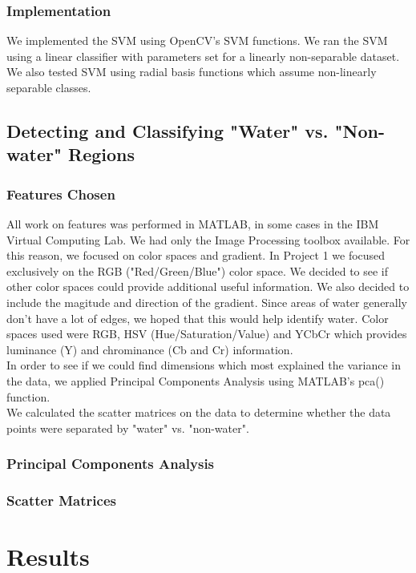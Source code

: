 \documentclass[12pt]{article}
\begin{document}
	\subsubsection{Implementation}
	We implemented the SVM using OpenCV's SVM functions. We ran the SVM using a linear classifier with parameters set for a linearly non-separable dataset. We also tested SVM using radial basis functions which assume non-linearly separable classes. 
	\subsection{Detecting and Classifying "Water" vs. "Non-water" Regions}
	\subsubsection{Features Chosen}
	All work on features was performed in MATLAB, in some cases in the IBM Virtual Computing Lab. We had only the Image Processing toolbox available. For this reason, we focused on color spaces and gradient. In Project 1 we focused exclusively on the RGB ("Red/Green/Blue") color space. We decided to see if other color spaces could provide additional useful information. We also decided to include the magitude and direction of the gradient. Since areas of water generally don't have a lot of edges, we hoped that this would help identify water. Color spaces used were RGB, HSV (Hue/Saturation/Value) and YCbCr which provides luminance (Y) and chrominance (Cb and Cr) information.\\
	In order to see if we could find dimensions which most explained the variance in the data, we applied Principal Components Analysis using MATLAB's pca() function. \\
	We calculated the scatter matrices on the data to determine whether the data points were separated by "water" vs. "non-water".
	\subsubsection{Principal Components Analysis}
	\subsubsection{Scatter Matrices}
	
\section{Results}
\end{document}
